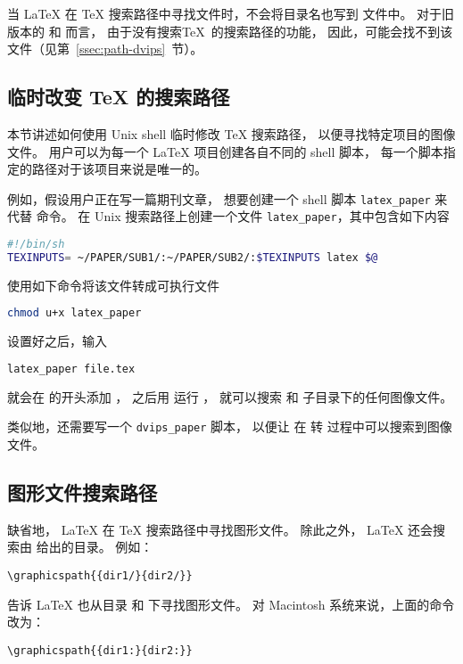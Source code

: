 当 \LaTeX{} 在 \TeX{} 搜索路径中寻找文件时，不会将目录名也写到  文件中。
对于旧版本的  和  而言，
由于没有搜索\TeX{}~的搜索路径的功能，
因此，可能会找不到该文件（见第~\ref{ssec:path-dvips}~节）。


\subsection{临时改变 \TeX{} 的搜索路径}\label{ssec:temptexpath}

本节讲述如何使用 Unix shell 临时修改 \TeX{} 搜索路径，
以便寻找特定项目的图像文件。
用户可以为每一个 \LaTeX{} 项目创建各自不同的 shell 脚本，
每一个脚本指定的路径对于该项目来说是唯一的。

例如，假设用户正在写一篇期刊文章，
想要创建一个 shell 脚本 \verb|latex_paper| 来代替  命令。
在 Unix 搜索路径上创建一个文件 \verb|latex_paper|，其中包含如下内容
\begin{lstlisting}[language=sh]
#!/bin/sh
TEXINPUTS= ~/PAPER/SUB1/:~/PAPER/SUB2/:$TEXINPUTS latex $@
\end{lstlisting}
使用如下命令将该文件转成可执行文件
\begin{lstlisting}[language=sh]
chmod u+x latex_paper
\end{lstlisting}

设置好之后，输入
\begin{lstlisting}[language=sh]
latex_paper file.tex
\end{lstlisting}
就会在  的开头添加 ，
之后用  运行 ，
就可以搜索  和  子目录下的任何图像文件。

类似地，还需要写一个 \verb|dvips_paper| 脚本，
以便让  在  转  过程中可以搜索到图像文件。

\subsection{图形文件搜索路径}\label{ssec:graphpath}
缺省地， \LaTeX{} 在 \TeX{} 搜索路径中寻找图形文件。
除此之外， \LaTeX{} 还会搜索由  给出的目录。
例如：
\begin{lstlisting}
\graphicspath{{dir1/}{dir2/}}
\end{lstlisting}
告诉 \LaTeX{} 也从目录  和  下寻找图形文件。
对 Macintosh 系统来说，上面的命令改为：
\begin{lstlisting}
\graphicspath{{dir1:}{dir2:}}
\end{lstlisting}

